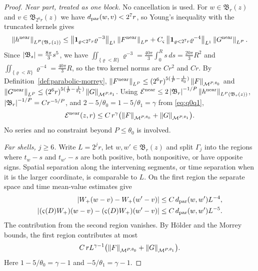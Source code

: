 \documentclass[11pt,reqno]{amsart}
\begin{document}
\begin{proof}
\emph{Near part, treated as one block.} No cancellation is used. For
$w\in\mathfrak{B}_{r}(z)$ and $v\in\mathfrak{B}_{2^{6}r}(z)$ we have
$d_{\mathrm{par}}(w,v)<2^{7}r$, so Young's inequality with the truncated kernels gives
\[
  \left\lVert h^{\mathrm{near}} \right\rVert_{L^{P}(\mathfrak{B}_{r}(z))}
  \le\left\lVert \mathbf{1}_{\varrho<2^{7}r}\varrho^{-3} \right\rVert_{L^{1}}
     \left\lVert F^{\mathrm{near}} \right\rVert_{L^{P}}
   +C_{\varsigma}\left\lVert \mathbf{1}_{\varrho<2^{7}r}\varrho^{-4} \right\rVert_{L^{1}}
     \left\lVert G^{\mathrm{near}} \right\rVert_{L^{P}} .
\]
Since $\left\lvert \mathfrak{B}_{s} \right\rvert=\tfrac{8\pi}{3}s^{5}$, we have
$\iint_{\{\varrho<R\}}\varrho^{-3}=\tfrac{40\pi}{3}\int_{0}^{R}s\,ds=\tfrac{20\pi}{3}R^{2}$
and $\iint_{\{\varrho<R\}}\varrho^{-4}=\tfrac{40\pi}{3}R$, so the two kernel
norms are $Cr^{2}$ and $Cr$. By Definition~\ref{def:parabolic-morrey},
$\left\lVert F^{\mathrm{near}} \right\rVert_{L^{P}}\le(2^{6}r)^{5(\frac1P-\frac1{\theta_{0}})}
 \left\lVert F \right\rVert_{\mathcal{M}^{P,\theta_{0}}}$ and
$\left\lVert G^{\mathrm{near}} \right\rVert_{L^{P}}\le(2^{6}r)^{5(\frac1P-\frac1{\theta_{1}})}
 \left\lVert G \right\rVert_{\mathcal{M}^{P,\theta_{1}}}$. Using
$\mathcal{E}^{\mathrm{near}}\le2\left\lvert \mathfrak{B}_{r} \right\rvert^{-1/P}
 \left\lVert h^{\mathrm{near}} \right\rVert_{L^{P}(\mathfrak{B}_{r}(z))}$,
$\left\lvert \mathfrak{B}_{r} \right\rvert^{-1/P}=Cr^{-5/P}$, and
$2-5/\theta_{0}=1-5/\theta_{1}=\gamma$ from \eqref{eq:q0q1},
\[
  \mathcal{E}^{\mathrm{near}}(z,r)\le
    C\,r^{\gamma}\bigl(\left\lVert F \right\rVert_{\mathcal{M}^{P,\theta_{0}}}
      +\left\lVert G \right\rVert_{\mathcal{M}^{P,\theta_{1}}}\bigr).
\]
No series and no constraint beyond $P\le\theta_{0}$ is involved.

\emph{Far shells, $j\ge6$.} Write $L=2^jr$, let
$w,w'\in\mathfrak B_r(z)$ and split $\Gamma_j$ into the regions where
$t_w-s$ and $t_{w'}-s$ are both positive, both nonpositive, or have opposite
signs. Spatial separation along the intervening segments, or time separation
when it is the larger coordinate, is comparable to $L$.
On the first region the separate space and time mean-value estimates give
\[
 \begin{aligned}
 |W_+(w-v)-W_+(w'-v)|&\le C\,d_{\mathrm{par}}(w,w')L^{-4},\\
 |(\varsigma(D)W_+)(w-v)-(\varsigma(D)W_+)(w'-v)|
       &\le C\,d_{\mathrm{par}}(w,w')L^{-5}.
 \end{aligned}
\]
The contribution from the second region vanishes. By H\"older and the
Morrey bounds, the first region contributes at most
\[
 C\,r L^{\gamma-1}
   \bigl(\left\lVert F \right\rVert_{\mathcal M^{P,\theta_0}}
                   +\left\lVert G \right\rVert_{\mathcal M^{P,\theta_1}}\bigr).
\]
Here $1-5/\theta_0=\gamma-1$ and $-5/\theta_1=\gamma-1$.


\end{proof}
\end{document}
